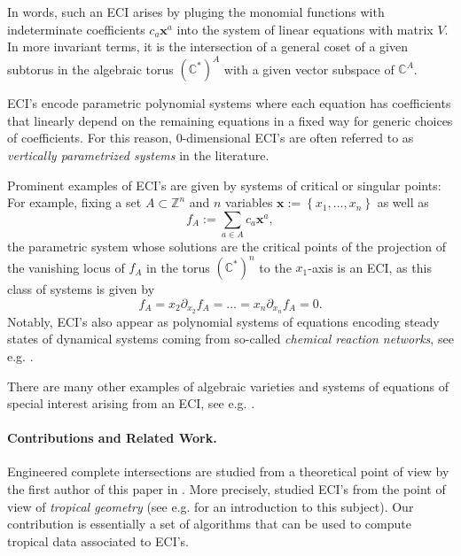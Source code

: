 \documentclass[a4paper]{article}
\theoremstyle{remark}
\newcommand{\set}[1]{\left\{#1\right\}}
\def\CC{\mathbb{C}}
\def\ZZ{\mathbb{Z}}
\def\xx{\mathbf{x}}
\begin{document}
In words, such an ECI arises by pluging the monomial functions with
indeterminate coefficients $c_a\xx^a$ into the system of linear
equations with matrix $V$. In more invariant terms, it is the
intersection of a general coset of a given subtorus in the algebraic
torus $(\CC^*)^A$ with a given vector subspace of $\CC^A$.

ECI's encode parametric polynomial systems where each equation has
coefficients that linearly depend on the remaining equations in a
fixed way for generic choices of coefficients. For this reason,
0-dimensional ECI's are often referred to as {\em vertically
  parametrized systems} in the literature.

Prominent examples of ECI's are given by systems of critical or
singular points: For example, fixing a set $A\subset \ZZ^n$ and $n$
variables $\xx := \set{x_1,\ldots, x_n}$ as well as
\[f_A := \sum_{a\in A} c_a\xx^a,\] the parametric system whose solutions are the
critical points of the projection of the vanishing locus of $f_A$ in
the torus $(\CC^{*})^n$ to the $x_1$-axis is an ECI, as this class of
systems is given by
\[f_A = x_2\partial_{x_2}f_{A} = \ldots = x_n\partial_{x_n}f_A = 0.\] Notably, ECI's also appear
as polynomial systems of equations encoding steady states of dynamical
systems coming from so-called {\em chemical reaction networks}, see
e.g. \cite{conradiIdentifyingParameterRegions2017,
  dickensteinAlgebraicGeometryTools2020}.

There are many other examples of algebraic varieties and systems of
equations of special interest arising from an ECI, see
e.g. \cite{esterovEngineeredCompleteIntersections2024,
  esterovEngineeredCompleteIntersections2025,
  selyaninNewtonNumbersVanishing2025}.

\paragraph*{Contributions and Related Work.}

Engineered complete intersections are studied from a theoretical point
of view by the first author of this paper in
\cite{esterovEngineeredCompleteIntersections2024,
  esterovEngineeredCompleteIntersections2025}. More precisely,
\cite{esterovEngineeredCompleteIntersections2024,
  esterovEngineeredCompleteIntersections2025} studied ECI's from the
point of view of \textit{tropical geometry} (see
e.g. \cite{maclaganIntroductionTropicalGeometry2021,
  mikhalkinTropicalGeometryIts2006} for an introduction to this
subject). Our contribution is essentially a set of algorithms that can
be used to compute tropical data associated to ECI's.
\end{document}
